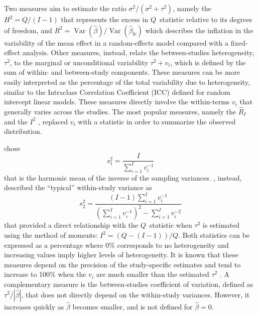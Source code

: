 \documentclass[11pt,a4paper,twoside,openany]{book}\usepackage{knitr}
\DeclareMathOperator{\Var}{Var}
\begin{document}
{{\noindent Two measures aim to estimate the ratio $\sigma^2/(\sigma^2 + \tau^2)$, namely the $H^2= Q/(I-1)$ that represents the excess in $Q$~statistic relative to its degrees of freedom, and $R^2 = \Var\left(\hat \beta\right)/\Var\left(\hat \beta_{\text{fe}}\right)$ which describes the inflation in the variability of the mean effect in a random-effects model compared with a fixed-effect analysis.
Other measures, instead, relate the between-studies heterogeneity, $\tau^2$, to the marginal or unconditional variability $\tau^2 + v_i$, which is defined by the sum of within- and between-study components. These measures can be more easily interpreted as the percentage of the total variability due to heterogeneity, similar to the Intraclass Correlation Coefficient (ICC) defined for random intercept linear models. These measures directly involve the within-terms $v_i$ that generally varies across the studies. The most popular measures, namely the $\hat R_I$ \citep{takkouche1999evaluation} and the $I^2$ \citep{higgins2002quantifying}, replaced $v_i$ with a statistic in order to summarize the observed distribution.

\noindent \cite{takkouche1999evaluation} chose
\begin{equation}
s_1^2 = \frac{I}{\sum_{i=1}^I v_i^{-1}}
\label{eq:Ri}
\end{equation}
\noindent that is the harmonic mean of the inverse of the sampling variances. 
\cite{higgins2002quantifying}, instead, described the ``typical'' within-study variance as
\begin{equation}
s_2^2 = \frac{(I-1) \sum_{i=1}^I v_i^{-1}}{ \left( \sum_{i=1}^I v_i^{-1} \right)^2 - \sum_{i=1}^I v_i^{-2}}
\label{eq:I2}
\end{equation}
\noindent that provided a direct relationship with the $Q$~statistic when $\tau^2$ is estimated using the method of moments: $I^2 = (Q - (I-1))/Q$.
\noindent Both statistics can be expressed as a percentage where 0\% corresponds to no heterogeneity and increasing values imply higher levels of heterogeneity. It is known that these measures depend on the precision of the study-specific estimates and tend to increase to 100\% when the $v_i$ are much smaller than the estimated $\tau^2$ \citep{takkouche1999evaluation, higgins2002quantifying}. 
A complementary measure is the between-studies coefficient of variation, defined as $\tau^2/|\hat \beta|$, that does not directly depend on the within-study variances. However, it increases quickly as $\hat \beta$ becomes smaller, and is not defined for $\hat \beta = 0$.



}}
\end{document}
